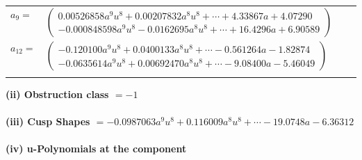 \documentclass[1p]{elsarticle_modified}
\theoremstyle{definition}
\begin{document}
\begin{tabular}{m{7pt} m{180pt} m{7pt} m{180pt} }
\flushright $a_{9}=$&$\begin{pmatrix}0.00526858 a^{9} u^{8}+0.00207832 a^{8} u^{8}+\cdots+4.33867 a+4.07290\\-0.000848598 a^{9} u^{8}-0.0162695 a^{8} u^{8}+\cdots+16.4296 a+6.90589\end{pmatrix}$ \\
\flushright $a_{12}=$&$\begin{pmatrix}-0.120100 a^{9} u^{8}+0.0400133 a^{8} u^{8}+\cdots-0.561264 a-1.82874\\-0.0635614 a^{9} u^{8}+0.00692470 a^{8} u^{8}+\cdots-9.08400 a-5.46049\end{pmatrix}$\\&\end{tabular}
\flushleft \textbf{(ii) Obstruction class $= -1$}\\~\\
\flushleft \textbf{(iii) Cusp Shapes $= -0.0987063 a^{9} u^{8}+0.116009 a^{8} u^{8}+\cdots-19.0748 a-6.36312$}\\~\\
\newpage\renewcommand{\arraystretch}{1}
\flushleft \textbf{(iv) u-Polynomials at the component}\newline \\
\end{document}
